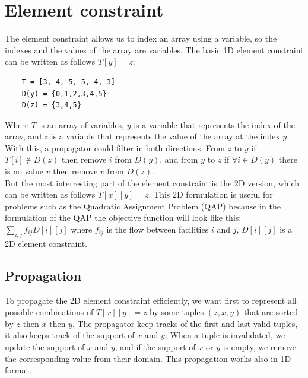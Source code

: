 \documentclass[12pt, openany]{report}
\theoremstyle{definition}
\begin{document}
\section{Element constraint}
The element constraint allows us to index an array using a variable, so the indexes and the values of the array are variables. The basic 1D element constraint can be written as follows $T[y] = z$:
\begin{lstlisting}
    T = [3, 4, 5, 5, 4, 3]
    D(y) = {0,1,2,3,4,5}
    D(z) = {3,4,5}
\end{lstlisting}
Where $T$ is an array of variables, $y$ is a variable that represents the index of the array, and $z$ is a variable that represents the value of the array at the index $y$. With this, a propagator could filter in both directions. From $z$ to $y$ if $T[i] \notin D(z)$ then remove $i$ from $D(y)$, and from $y$ to $z$ if $\forall i \in D(y)$ there is no value $v$ then remove $v$ from $D(z)$.\\
But the most interresting part of the element constraint is the 2D version, which can be written as follows $T[x][y] = z$. This 2D formulation is useful for problems such as the Quadratic Assignment Problem (QAP) because in the formulation of the QAP the objective function will look like this: $\sum_{i,j} f_{ij} D[i][j]$ where $f_{ij}$ is the flow between facilities $i$ and $j$, $D[i][j]$ is a 2D element constraint. 
\subsection{Propagation}
To propagate the 2D element constraint efficiently, we want first to represent all possible combinations of $T[x][y] = z$ by some tuples $(z,x,y)$ that are sorted by $z$ then $x$ then $y$. The propagator keep tracks of the first and last valid tuples, it also keeps track of the support of $x$ and $y$. When a tuple is invalidated, we update the support of $x$ and $y$, and if the support of $x$ or $y$ is empty, we remove the corresponding value from their domain. This propagation works also in 1D format. 
\end{document}
